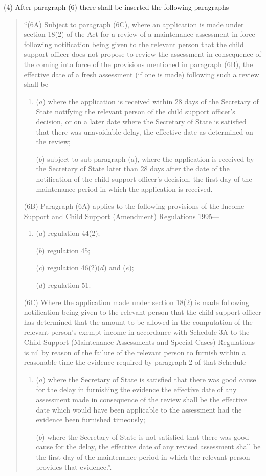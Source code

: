 \documentclass[a4paper]{article}
\begin{document}
(4) After paragraph (6) there shall be inserted the following paragraphs—
\begin{quotation}
“(6A) Subject to paragraph (6C), where an application is made under section 18(2) of the Act for a review of a maintenance assessment in force following notification being given to the relevant person that the child support officer does not propose to review the assessment in consequence of the coming into force of the provisions mentioned in paragraph (6B), the effective date of a fresh assessment (if one is made) following such a review shall be—
\begin{enumerate}\item[]
($a$) where the application is received within 28 days of the Secretary of State notifying the relevant person of the child support officer’s decision, or on a later date where the Secretary of State is satisfied that there was unavoidable delay, the effective date as determined on the review;

($b$) subject to sub-paragraph ($a$), where the application is received by the Secretary of State later than 28 days after the date of the notification of the child support officer’s decision, the first day of the maintenance period in which the application is received.
\end{enumerate}

(6B) Paragraph (6A) applies to the following provisions of the Income Support and Child Support (Amendment) Regulations 1995—
\begin{enumerate}\item[]
($a$) regulation 44(2);

($b$) regulation 45;

($c$) regulation 46(2)($d$) and ($e$);

($d$) regulation 51.
\end{enumerate}

(6C) Where the application made under section 18(2) is made following notification being given to the relevant person that the child support officer has determined that the amount to be allowed in the computation of the relevant person’s exempt income in accordance with Schedule 3A to the Child Support (Maintenance Assessments and Special Cases) Regulations is nil by reason of the failure of the relevant person to furnish within a reasonable time the evidence required by paragraph 2 of that Schedule—
\begin{enumerate}\item[]
($a$) where the Secretary of State is satisfied that there was good cause for the delay in furnishing the evidence the effective date of any assessment made in consequence of the review shall be the effective date which would have been applicable to the assessment had the evidence been furnished timeously;

($b$) where the Secretary of State is not satisfied that there was good cause for the delay, the effective date of any revised assessment shall be the first day of the maintenance period in which the relevant person provides that evidence.”.
\end{enumerate}
\end{quotation}
\end{document}
